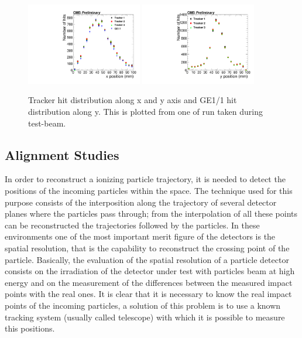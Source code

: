 \begin{figure}[!htbp]
\centering
\includegraphics[width=0.45\textwidth]{figures/GEM/Tracker_Hit_position_Run1644_x.pdf}%
\includegraphics[width=0.45\textwidth]{figures/GEM/Tracker_Hit_position_Run1644_y.pdf}
\caption{Tracker hit distribution along x and y axis and GE1/1 hit distribution along y. This is plotted from one of run taken during test-beam.}
\label{HitPosXaxis}
\end{figure}






\subsection{Alignment Studies}

In order to reconstruct a ionizing particle trajectory, it is needed to detect the positions of the incoming particles within the space. The technique used for this purpose consists of the interposition along the trajectory of several detector planes where the particles pass through; from the interpolation of all these points can be reconstructed the trajectories followed by the particles. In these environments one of the most important merit figure of the detectors is the spatial resolution, that is the capability to reconstruct the crossing point of the particle. Basically, the evaluation of the spatial resolution of a particle detector consists on the irradiation of the detector under test with particles beam at high energy and on the measurement of the differences between the measured impact points with the real ones. It is clear that it is necessary to know the real impact points of the incoming particles, a solution of this problem is to use a known tracking system (usually called telescope) with which it is possible to measure this positions.

